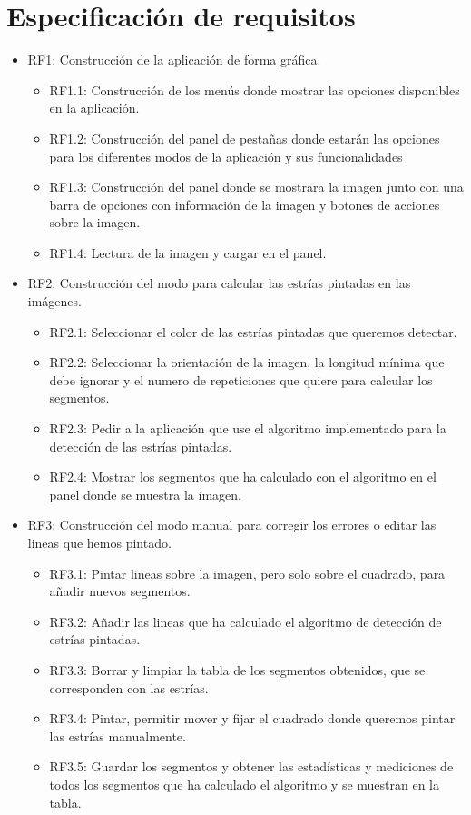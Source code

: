\section{Especificación de requisitos}
\begin{itemize}
	 
\item RF1: Construcción de la aplicación de forma gráfica.
	\begin{itemize}
		\item RF1.1: Construcción de los menús donde mostrar las opciones disponibles en la aplicación.
		\item RF1.2: Construcción del panel de pestañas donde estarán las opciones para los diferentes modos de la aplicación y sus funcionalidades
		\item RF1.3: Construcción del panel donde se mostrara la imagen junto con una barra de opciones con información de la imagen y botones de acciones sobre la imagen.
		\item RF1.4: Lectura de la imagen y cargar en el panel.
	\end{itemize}

\item RF2: Construcción del modo para calcular las estrías pintadas en las imágenes.
	\begin{itemize}
		\item RF2.1: Seleccionar el color de las estrías pintadas que queremos detectar.
		\item RF2.2: Seleccionar la orientación de la imagen, la longitud mínima que debe ignorar y el numero de repeticiones que quiere para calcular los segmentos.
		\item RF2.3: Pedir a la aplicación que use el algoritmo implementado para la detección de las estrías pintadas.			 
		\item RF2.4: Mostrar los segmentos que ha calculado con el algoritmo en el panel donde se muestra la imagen.
	\end{itemize}

\item RF3: Construcción del modo manual para corregir los errores o editar las lineas que hemos pintado.
	\begin{itemize}
		\item RF3.1: Pintar lineas sobre la imagen, pero solo sobre el cuadrado, para añadir nuevos segmentos.
		\item RF3.2: Añadir las lineas que ha calculado el algoritmo de detección de estrías pintadas.
		\item RF3.3: Borrar y limpiar la tabla de los segmentos obtenidos, que se corresponden con las estrías.
		\item RF3.4: Pintar, permitir mover y fijar el cuadrado donde queremos pintar las estrías manualmente.
		\item RF3.5: Guardar los segmentos y obtener las estadísticas y mediciones de todos los segmentos que ha calculado el algoritmo y se muestran en la tabla.			
	\end{itemize}
			 

\end{itemize}
